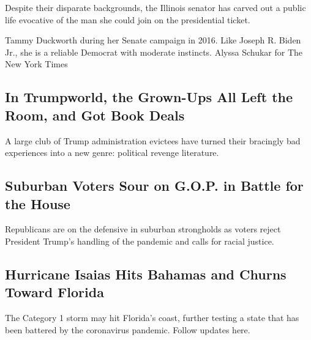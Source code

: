 Despite their disparate backgrounds, the Illinois senator has carved out
a public life evocative of the man she could join on the presidential
ticket.

\href{/2020/08/01/us/politics/tammy-duckworth-biden-vp.html}{}

Tammy Duckworth during her Senate campaign in 2016. Like Joseph R. Biden
Jr., she is a reliable Democrat with moderate instincts. Alyssa Schukar
for The New York Times

\href{/2020/08/01/us/politics/trump-books.html}{}

\hypertarget{in-trumpworld-the-grown-ups-all-left-the-room-and-got-book-deals}{%
\subsection{In Trumpworld, the Grown-Ups All Left the Room, and Got Book
Deals}\label{in-trumpworld-the-grown-ups-all-left-the-room-and-got-book-deals}}

A large club of Trump administration evictees have turned their
bracingly bad experiences into a new genre: political revenge
literature.

\href{/2020/08/01/us/politics/trump-suburban-voters-republicans-house.html}{}

\hypertarget{suburban-voters-sour-on-gop-in-battle-for-the-house}{%
\subsection{Suburban Voters Sour on G.O.P. in Battle for the
House}\label{suburban-voters-sour-on-gop-in-battle-for-the-house}}

Republicans are on the defensive in suburban strongholds as voters
reject President Trump's handling of the pandemic and calls for racial
justice.

\href{/2020/08/01/us/hurricane-isaias-updates.html}{}

\hypertarget{hurricane-isaias-hits-bahamas-and-churns-toward-florida}{%
\subsection{Hurricane Isaias Hits Bahamas and Churns Toward
Florida}\label{hurricane-isaias-hits-bahamas-and-churns-toward-florida}}

\href{/2020/08/01/us/hurricane-isaias-updates.html}{}

The Category 1 storm may hit Florida's coast, further testing a state
that has been battered by the coronavirus pandemic. Follow updates here.

